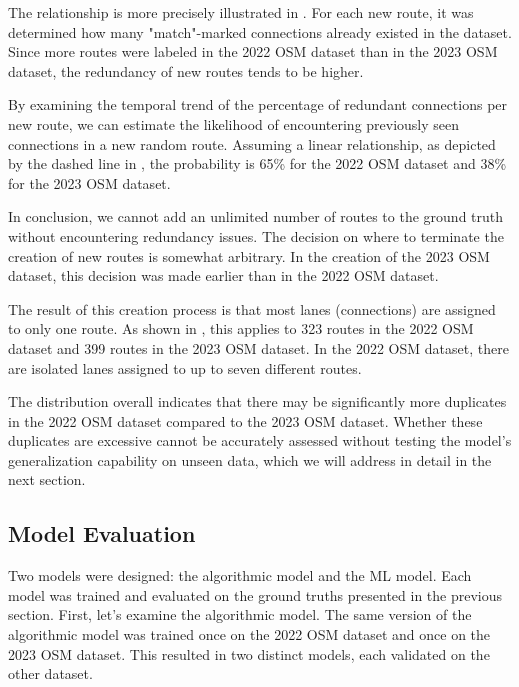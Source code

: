 The relationship is more precisely illustrated in . For each new route, it was determined how many "match"-marked connections already existed in the dataset. Since more routes were labeled in the 2022 OSM dataset than in the 2023 OSM dataset, the redundancy of new routes tends to be higher.

By examining the temporal trend of the percentage of redundant connections per new route, we can estimate the likelihood of encountering previously seen connections in a new random route. Assuming a linear relationship, as depicted by the dashed line in , the probability is 65\% for the 2022 OSM dataset and 38\% for the 2023 OSM dataset.

In conclusion, we cannot add an unlimited number of routes to the ground truth without encountering redundancy issues. The decision on where to terminate the creation of new routes is somewhat arbitrary. In the creation of the 2023 OSM dataset, this decision was made earlier than in the 2022 OSM dataset.

The result of this creation process is that most lanes (connections) are assigned to only one route. As shown in , this applies to 323 routes in the 2022 OSM dataset and 399 routes in the 2023 OSM dataset. In the 2022 OSM dataset, there are isolated lanes assigned to up to seven different routes.

The distribution overall indicates that there may be significantly more duplicates in the 2022 OSM dataset compared to the 2023 OSM dataset. Whether these duplicates are excessive cannot be accurately assessed without testing the model's generalization capability on unseen data, which we will address in detail in the next section.

\subsection{Model Evaluation}

Two models were designed: the algorithmic model and the ML model. Each model was trained and evaluated on the ground truths presented in the previous section. First, let's examine the algorithmic model. The same version of the algorithmic model was trained once on the 2022 OSM dataset and once on the 2023 OSM dataset. This resulted in two distinct models, each validated on the other dataset.

